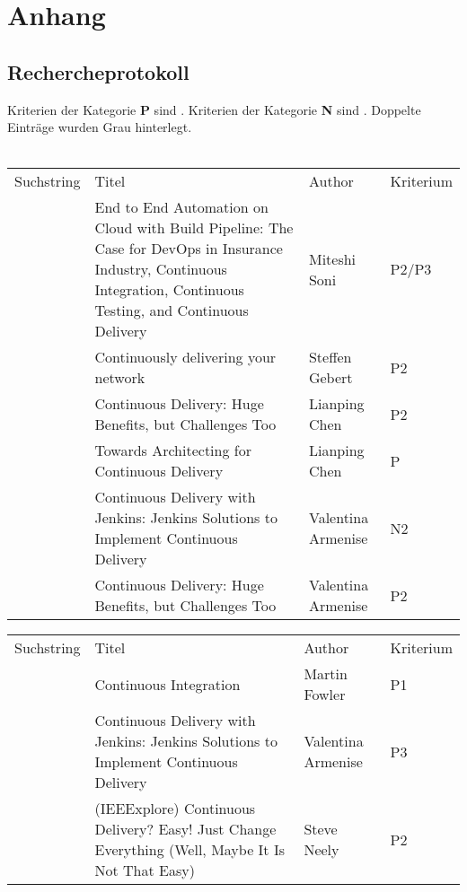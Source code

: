 \chapter{Anhang}
\label{chap:anhang}

\section{Rechercheprotokoll}
\label{sec:rechercheprotokoll}
Kriterien der Kategorie \textbf{P} sind . Kriterien der Kategorie \textbf{N} sind . Doppelte Einträge wurden Grau hinterlegt.
\\\\
\noindent
\begin{tabular}{|l|L{8cm}|l|l|}
\hline
     \\ \hline
    Suchstring & Titel & Author & Kriterium\\ \hline
     & End to End Automation on Cloud with Build Pipeline: The Case for DevOps in Insurance Industry, Continuous Integration, Continuous Testing, and Continuous Delivery & Miteshi Soni & P2/P3 \\ \hline
     & Continuously delivering your network & Steffen Gebert & P2\\ \hline
     & Continuous Delivery: Huge Benefits, but Challenges Too & Lianping Chen & P2\\ \hline
     & Towards Architecting for Continuous Delivery & Lianping Chen & P \\ \hline
    
     & Continuous Delivery with Jenkins: Jenkins Solutions to Implement Continuous Delivery & Valentina Armenise & N2 \\ \hline
     & Continuous Delivery: Huge Benefits, but Challenges Too & Valentina Armenise & P2 \\ \hline
\end{tabular} 
\noindent
\begin{tabular}{|l|L{8cm}|l|l|} \hline
      \\ \hline
    Suchstring & Titel & Author & Kriterium\\ \hline
     & Continuous Integration & Martin Fowler & P1 \\ \hline
    
     & Continuous Delivery with Jenkins: Jenkins Solutions to Implement Continuous Delivery & Valentina Armenise & P3\\ \hline
     &  (IEEExplore) Continuous Delivery? Easy! Just Change Everything (Well, Maybe It Is Not That Easy) & Steve Neely & P2\\ \hline
\end{tabular} 
\noindent
